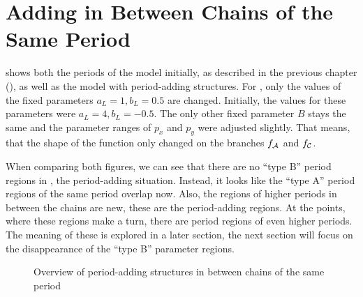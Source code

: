 \section{Adding in Between Chains of the Same Period}

 shows both the periods of the model initially, as described in the previous chapter (), as well as the model with period-adding structures.
For , only the values of the fixed parameters $a_L = 1, b_L = 0.5$ are changed.
Initially, the values for these parameters were $a_L = 4, b_L = -0.5$.
The only other fixed parameter $B$ stays the same and the parameter ranges of $p_x$ and $p_y$ were adjusted slightly.
That means, that the shape of the function only changed on the branches $f_{\mathcal{A}}$ and $f_{\mathcal{C}}$.

When comparing both figures, we can see that there are no ``type B'' period regions in , the period-adding situation.
Instead, it looks like the ``type A'' period regions of the same period overlap now.
Also, the regions of higher periods in between the chains are new, these are the period-adding regions.
At the points, where these regions make a turn, there are period regions of even higher periods.
The meaning of these is explored in a later section, the next section will focus on the disappearance of the ``type B'' parameter regions.

\begin{figure}
    \centering
    \caption{Overview of period-adding structures in between chains of the same period}
    \label{fig:minrep.adding1.overview}
\end{figure}


